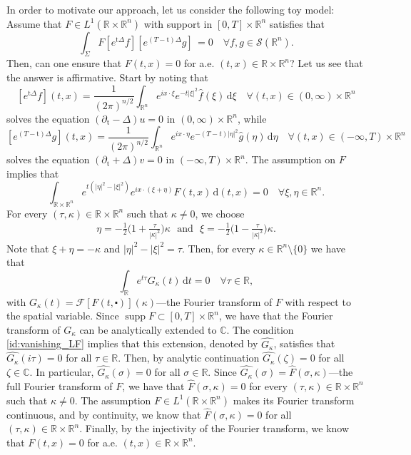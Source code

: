 \documentclass[10pt,a4paper]{amsart}
\DeclareMathOperator{\supp}{supp}
\newcommand{\R}{\mathbb{R}}
\newcommand{\C}{\mathbb{C}}
\newcommand{\dd}{\mathrm{d}}
\newcommand{\tm}{\mathrm{t}}
\begin{document}
In order to motivate our approach, let us 
consider the following toy model: Assume that 
$F \in L^1(\R \times \R^n)$ with support in $[0, T] \times \R^n$ satisfies that
\[ \int_\Sigma F  [e^{\tm \Delta}f] [e^{(T - \tm) \Delta}g] \, = 0 \quad \forall f, g \in \mathcal{S}(\R^n). \]
Then, can one ensure that $F(t, x) = 0$ for a.e.
$(t, x) \in \R \times \R^n$? Let us see that the answer is affirmative.
Start by noting that
\[ [e^{\tm \Delta}f] (t,x) = \frac{1}{(2\pi)^{n/2}} \int_{\R^n} e^{ix \cdot \xi} e^{-t|\xi|^2} \widehat{f}(\xi) \, \dd \xi \quad \forall (t, x) \in (0, \infty) \times \R^n \]
solves the equation $(\partial_\tm - \Delta) u = 0$ in $(0, \infty) \times \R^n$, while
\[ [e^{(T - \tm) \Delta}g] (t,x) = \frac{1}{(2\pi)^{n/2}} \int_{\R^n} e^{ix \cdot \eta} e^{-(T-t)|\eta|^2} \widehat{g}(\eta) \, \dd \eta \quad \forall (t, x) \in (-\infty, T) \times \R^n \]
solves the equation $(\partial_\tm + \Delta) v = 0$ in $(-\infty, T) \times \R^n$. The 
assumption on $F$ implies that
\[ \int_{\R \times \R^n} e^{t(|\eta|^2 - |\xi|^2)} e^{i x \cdot (\xi + \eta)} F(t, x) \, \dd (t, x) = 0 \quad \forall \xi, \eta \in \R^n. \]
For every $(\tau, \kappa) \in \R \times \R^n$ such that $\kappa \neq 0$, we choose
\begin{align*}
    \eta=- \frac{1}{2}\big(1+\frac{\tau}{|\kappa|^2}\big)\kappa   ~~~\text{and}~~~\xi= -\frac{1}{2}\big(1-\frac{\tau}{|\kappa|^2}\big)\kappa.
\end{align*}
Note that $\xi+\eta = - \kappa$ and $|\eta|^2 - |\xi|^2 = \tau$.
Then, for every $\kappa \in \R^n \setminus \{ 0 \}$ we have that
\begin{equation}
\label{id:vanishing_LF}
\int_\R e^{t\tau} G_\kappa (t) \,\dd t = 0 \quad \forall \tau \in \R,
\end{equation}
with $ G_\kappa (t) = \mathcal{F}[F(t, \centerdot)](\kappa) $---the Fourier transform of $F$
with respect to the spatial variable.
Since $\supp F \subset [0,T] \times \R^n$, we have that the Fourier transform of $G_\kappa$ 
can be analytically extended to $\C$. The condition 
\eqref{id:vanishing_LF} implies that this extension, denoted by $\widehat{G_\kappa}$, 
satisfies that $\widehat{G_\kappa}(i\tau) = 0$ for all $\tau \in \R$. Then, by analytic 
continuation $\widehat{G_\kappa}(\zeta) = 0$ for all $\zeta \in \C$. In particular,
$\widehat{G_\kappa}(\sigma) = 0$ for all $\sigma \in \R$. Since 
$\widehat{G_\kappa}(\sigma) = \widehat{F}(\sigma, \kappa)$---the full Fourier transform of 
$F$, we have that $\widehat{F}(\sigma, \kappa) = 0$ for every
$(\tau, \kappa) \in \R \times \R^n$ such that $\kappa \neq 0$. The assumption 
$F \in L^1(\R \times \R^n)$ makes its Fourier transform continuous, and by continuity, we 
know that $\widehat{F}(\sigma, \kappa) = 0$ for all $(\tau, \kappa) \in \R \times \R^n$.
Finally, by the injectivity of the Fourier transform, we know that $F(t, x) = 0$ for 
a.e. $(t, x) \in \R \times \R^n$.
\end{document}
